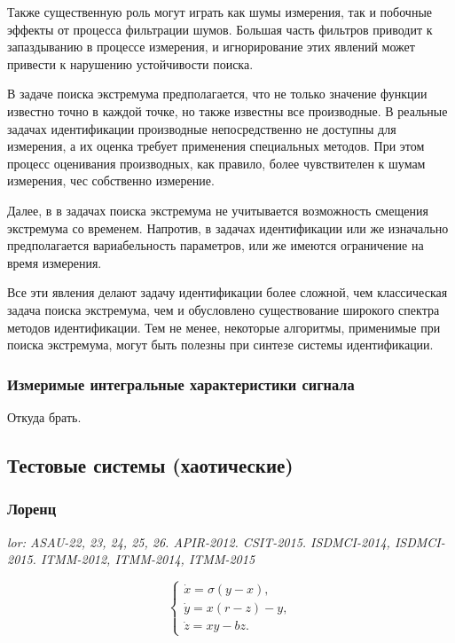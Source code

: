\documentclass[a4paper,12pt]{article}
\newcommand{\LinkRef}[1]{ \textit{#1} }
\begin{document}
Также существенную роль могут играть как шумы измерения, так и побочные
эффекты от процесса фильтрации шумов. Большая часть фильтров приводит к запаздыванию
в процессе измерения, и игнорирование этих явлений может привести
к нарушению устойчивости поиска.

В задаче поиска экстремума предполагается, что не только
значение функции известно точно в каждой точке, но также известны все производные.
В реальные задачах идентификации производные непосредственно
не доступны для измерения, а их оценка требует применения специальных
методов. При этом процесс оценивания производных, как правило,
более чувствителен к шумам измерения, чес собственно измерение.

Далее, в в задачах поиска экстремума не учитывается возможность
смещения экстремума со временем. Напротив, в задачах идентификации
или же изначально предполагается вариабельность параметров, или же
имеются ограничение на время измерения.


Все эти явления делают задачу идентификации более сложной, чем
классическая задача поиска экстремума, чем и обусловлено
существование широкого спектра методов идентификации. Тем не менее,
некоторые алгоритмы, применимые при поиска экстремума, могут быть
полезны при синтезе системы идентификации.






\subsubsection{Измеримые интегральные характеристики сигнала}

Откуда брать.


\subsection{Тестовые системы (хаотические)}

\subsubsection{Лоренц} %

\LinkRef{
  lor: ASAU-22, 23, 24, 25, 26. APIR-2012. CSIT-2015. ISDMCI-2014, ISDMCI-2015.
  ITMM-2012, ITMM-2014, ITMM-2015
}

\begin{equation}
\begin{cases}
  \dot{x} = \sigma (y-x ) , \\
  \dot{y} = x (r-z) - y , \\
  \dot{z} = x y - b z .
\end{cases}
\label{atu:eq:lor}
\end{equation}
\end{document}
